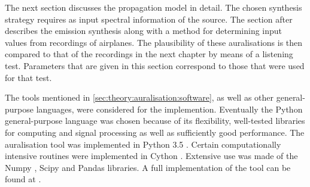 The next section discusses the propagation model in detail. The chosen synthesis
strategy requires as input spectral information of the source. The section after
describes the emission synthesis along with a method
for determining input values from recordings of airplanes. The plausibility
of these auralisations is then compared to that of the recordings in the next
chapter by means of a listening test. Parameters that are given in this section
correspond to those that were used for that test.

The tools mentioned in \ref{sec:theory:auralisation:software}, as well as other
general-purpose languages, were considered for the implemention.
Eventually the Python general-purpose language was chosen because of its flexibility,
well-tested libraries for computing and signal processing as well as sufficiently good
performance. The auralisation tool was implemented in Python 3.5 \cite{Python}.
Certain computationally intensive routines were implemented in Cython \cite{Behnel2011,Cython}.
Extensive use was made of the Numpy \cite{VanderWalt2011,Numpy}, Scipy \cite{Scipy} and
Pandas \cite{Mckinney2010} libraries. A full implementation of the tool can be
found at \cite{Rietdijk2017d}.
